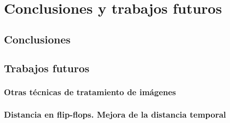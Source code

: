 \chapter{Conclusiones y trabajos futuros}
\label{ch:FFdist}


\section{Conclusiones}
\label{sec:Conclusiones}



\section{Trabajos futuros}
\label{sec:TrabajosFuturos}


\subsection{Otras técnicas de tratamiento de imágenes}
\label{subsec:OtrasTecnicasImag}




\subsection{Distancia en flip-flops. Mejora de la distancia temporal}
\label{subsec:FFdist}


\endinput
